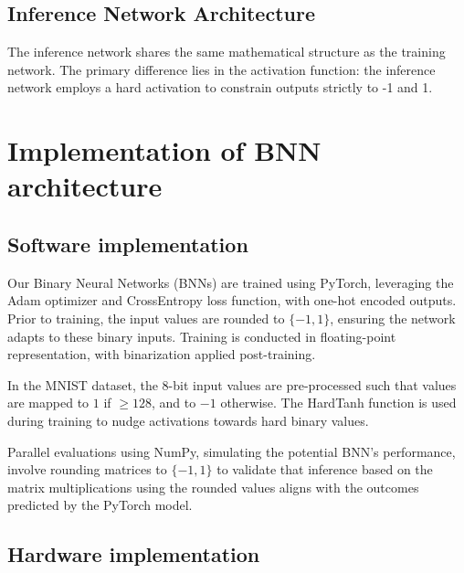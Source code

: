\documentclass[conference]{IEEEtran}
\newcounter{todocount}
\newcommand{\todo}[1]{
  \stepcounter{todocount}
}
\begin{document}
\subsection{Inference Network Architecture}
The inference network shares the same mathematical structure as the training network. The primary difference lies in the activation function: the inference network employs a hard activation to constrain outputs strictly to -1 and 1.



\section{Implementation of BNN architecture}
\subsection{Software implementation}
Our Binary Neural Networks (BNNs) are trained using PyTorch, leveraging the Adam optimizer and CrossEntropy loss function, with one-hot encoded outputs. Prior to training, the input values are rounded to \(\{-1, 1\}\), ensuring the network adapts to these binary inputs. Training is conducted in floating-point representation, with binarization applied post-training.

In the MNIST dataset, the 8-bit input values are pre-processed such that values are mapped to $1$ if $\geq 128$, and to $-1$ otherwise. The HardTanh function is used during training to nudge activations towards hard binary values. 

Parallel evaluations using NumPy, simulating the potential BNN's performance, involve rounding matrices to \(\{-1, 1\}\) to validate that inference based on the matrix multiplications using the rounded values aligns with the outcomes predicted by the PyTorch model.


\subsection{Hardware implementation}


\end{document}
